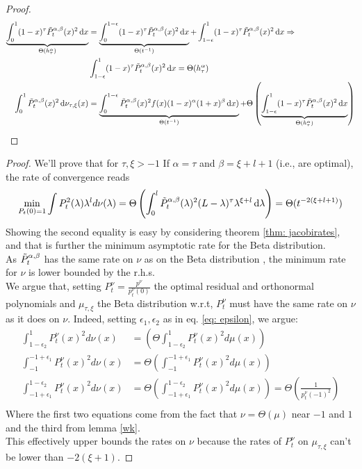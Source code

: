 \documentclass{article}
\begin{document}
\begin{proof}
\begin{align}
    \underbrace{\int_0^1(1-x)^\tau\Tilde{P}_t^{\alpha,\beta}(x)^2\mathop{}\!\mathrm{d} x}_{\Theta( h_\tau^\alpha)}&=\underbrace{\int_0^{1-\epsilon}(1-x)^\tau\Tilde{P}_t^{\alpha,\beta}(x)^2\mathop{}\!\mathrm{d} x}_{\Theta( t^{-1})
    } +\int_{1-\epsilon}^1(1-x)^\tau\Tilde{P}_t^{\alpha,\beta}(x)^2\mathop{}\!\mathrm{d} x \Rightarrow\\
    &\int_{1-\epsilon}^1(1-x)^\tau\Tilde{P}_t^{\alpha,\beta}(x)^2\mathop{}\!\mathrm{d} x  =\Theta( h_\tau^\alpha) \\
    \int_0^1 \Tilde{P}_t^{\alpha,\beta}(x)^2\mathop{}\!\mathrm{d}\nu_{\tau,\xi}(x)&=
    \underbrace{\int_0^{1-\epsilon} \Tilde{P}_t^{\alpha,\beta}(x)^2 f(x) (1-x)^\alpha(1+x)^\beta\mathop{}\!\mathrm{d} x)}_{\Theta( t^{-1})
    }+\Theta\left(
    \underbrace{\int_{1-\epsilon}^1(1-x)^\tau\Tilde{P}_t^{\alpha,\beta}(x)^2\mathop{}\!\mathrm{d} x}_{\Theta( h_\tau^\alpha)}\right)
\end{align}


\end{proof}

\jacoptimal*
\begin{proof}
We'll prove that for $\tau,\xi>-1$ If $\alpha = \tau$ and $\beta = \xi+l+1$ (i.e., are optimal), the rate of convergence reads
\begin{equation}
    \min_{P_t(0)=1}\int P_t^2(\lambda)\lambda^ld\nu(\lambda)=\Theta\left( \int_{0}^l  \Tilde{P}_t^{\alpha,\beta}(\lambda)^2(L-\lambda)^\tau\lambda^{\xi+l}\mathop{}\!\mathrm{d} \lambda\right) =\Theta( t^{-2(\xi+l+1)})
\end{equation}
Showing the second equality is easy by considering theorem \ref{thm: jacobirates}, and that is further the minimum asymptotic rate for the Beta distribution. \\
As $\Tilde{P}^{\alpha,\beta}_t$ has the same rate on $\nu$ as  on the Beta distribution , the minimum rate for $\nu$ is lower bounded by the r.h.s. \\
We argue that, setting $P^\nu_t=\frac{p^\nu}{p^\nu_t(0)}$ the optimal residual and orthonormal polynomials and $\mu_{\tau,\xi}$ the Beta distribution  w.r.t, $P^\nu_t$ must have the same rate on $\nu$ as it does on $\nu$. Indeed, setting $\epsilon_1,\epsilon_2$ as in eq. \ref{eq: epsilon}, we argue:
\begin{align}
    \int_{1-\epsilon_2}^{1}P_t^\nu(x)^2d\nu(x)&=\left(\Theta\int_{1-\epsilon_2}^{1}P_t^\nu(x)^2d\mu(x)\right)\\
    \int_{-1}^{-1+\epsilon_1}P_t^\nu(x)^2d\nu(x)&=\Theta\left(\int_{-1}^{-1+\epsilon_1}P_t^\nu(x)^2d\mu(x)\right)\\
    \int_{-1+\epsilon_1}^{1-\epsilon_2}P_t^\nu(x)^2d\nu(x)&=\Theta\left(\int_{-1+\epsilon_1}^{1-\epsilon_2}P_t^\nu(x)^2d\mu(x)\right)=\Theta\left(\frac{1}{p_t^\nu(-1)^2}\right)\\
\end{align}
Where the first two equations come from the fact that $\nu=\Theta(\mu)$ near $-1$ and $1$ and the third from lemma \ref{wk}.\\
This effectively upper bounds the rates on $\nu$ because the rates of $P_t^\nu$ on $\mu_{\tau,\xi}$ can't be lower than $-2(\xi+1)$.
\end{proof}
\end{document}
